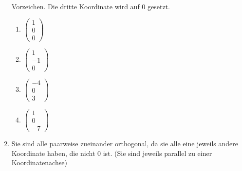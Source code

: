 \begin{enumerate}
  Vorzeichen. Die dritte Koordinate wird auf 0 gesetzt.
  \begin{multicols}{4}
    \begin{enumerate}
    \item $  
      \begin{pmatrix}
        1\\0\\0
      \end{pmatrix}
      $
    \item $  
      \begin{pmatrix}
        1\\-1\\0
      \end{pmatrix}
      $
    \item $  
      \begin{pmatrix}
        -4\\0\\3
      \end{pmatrix}
      $
    \item $  
      \begin{pmatrix}
        1\\0\\-7
      \end{pmatrix}
      $
    \end{enumerate}
  \end{multicols}
\item Sie sind alle paarweise zueinander orthogonal, da sie alle eine
  jeweils andere Koordinate haben, die nicht 0 ist. (Sie sind jeweils parallel
  zu einer Koordinatenachse)
\end{enumerate}
